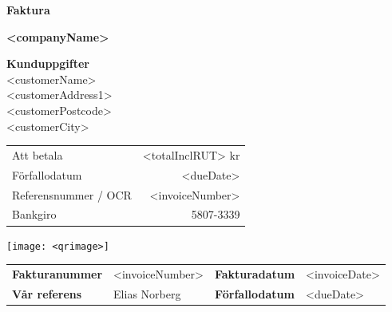 \documentclass[a4paper,11pt]{extarticle}
\begin{document}
\pagestyle{fancy}
\fancyhf{} %
\renewcommand{\headrulewidth}{0pt}
\renewcommand{\footrulewidth}{0pt}

\setlength{\fboxsep}{1.5em}
\setlength{\parindent}{0pt}

\begin{minipage}[b]{0.4\textwidth}
\raggedright
{\color{Primary}
\fontsize{36}{0}\selectfont
\textbf{Faktura}}
\end{minipage}%
\begin{minipage}[b]{0.6\textwidth}
\raggedleft
{\color{Secondary}
\fontsize{36}{0}\selectfont
\textbf{<companyName>}}
\end{minipage}

\vspace{2em}
\parbox{0.3\textwidth}{
\begin{tcolorbox}[height=3cm,valign=center]
    \textbf{Kunduppgifter} \\
    <customerName>\\
    <customerAddress1>\\
    <customerPostcode>\\
    <customerCity>\\
\end{tcolorbox}
}%
\hfill
\parbox{0.67\textwidth}{%
\begin{tcolorbox}[height=3cm,valign=center]
\parbox{0.45\textwidth}{%
\large\color{Primary}
\begin{tabularx}{\textwidth}{@{}lr}
    Att betala & <totalInclRUT> kr \\
    Förfallodatum & <dueDate> \\
    Referensnummer / OCR & <invoiceNumber> \\
    Bankgiro & 5807-3339 \\
\end{tabularx}
}\hfill\parbox{2.5cm}{\texttt{[image: <qrimage>]}}
\end{tcolorbox}
}

\vspace{1em}

\renewcommand\arraystretch{1.5}
{\small
\begin{tabularx}{\linewidth}{XlXl}
    \textbf{Fakturanummer} & <invoiceNumber> & \textbf{Fakturadatum} & <invoiceDate> \\
    \textbf{Vår referens} & Elias Norberg & \textbf{Förfallodatum} & <dueDate> \\
\end{tabularx}
}
\end{document}
